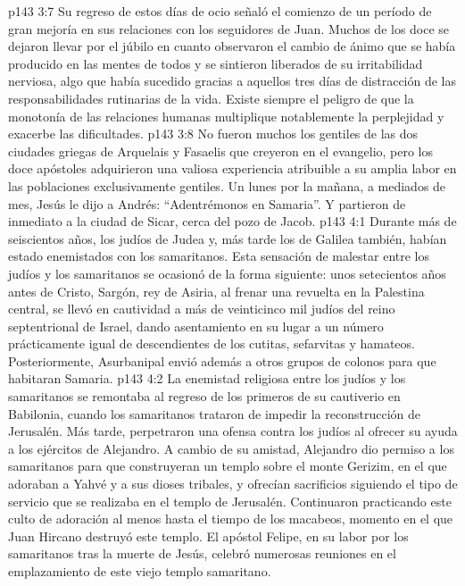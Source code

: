 \vs p143 3:7 Su regreso de estos días de ocio señaló el comienzo de un período de gran mejoría en sus relaciones con los seguidores de Juan. Muchos de los doce se dejaron llevar por el júbilo en cuanto observaron el cambio de ánimo que se había producido en las mentes de todos y se sintieron liberados de su irritabilidad nerviosa, algo que había sucedido gracias a aquellos tres días de distracción de las responsabilidades rutinarias de la vida. Existe siempre el peligro de que la monotonía de las relaciones humanas multiplique notablemente la perplejidad y exacerbe las dificultades.
\vs p143 3:8 \pc No fueron muchos los gentiles de las dos ciudades griegas de Arquelais y Fasaelis que creyeron en el evangelio, pero los doce apóstoles adquirieron una valiosa experiencia atribuible a su amplia labor en las poblaciones exclusivamente gentiles. Un lunes por la mañana, a mediados de mes, Jesús le dijo a Andrés: “Adentrémonos en Samaria”. Y partieron de inmediato a la ciudad de Sicar, cerca del pozo de Jacob.
\vs p143 4:1 Durante más de seiscientos años, los judíos de Judea y, más tarde los de Galilea también, habían estado enemistados con los samaritanos. Esta sensación de malestar entre los judíos y los samaritanos se ocasionó de la forma siguiente: unos setecientos años antes de Cristo, Sargón, rey de Asiria, al frenar una revuelta en la Palestina central, se llevó en cautividad a más de veinticinco mil judíos del reino septentrional de Israel, dando asentamiento en su lugar a un número prácticamente igual de descendientes de los cutitas, sefarvitas y hamateos. Posteriormente, Asurbanipal envió además a otros grupos de colonos para que habitaran Samaria.
\vs p143 4:2 La enemistad religiosa entre los judíos y los samaritanos se remontaba al regreso de los primeros de su cautiverio en Babilonia, cuando los samaritanos trataron de impedir la reconstrucción de Jerusalén. Más tarde, perpetraron una ofensa contra los judíos al ofrecer su ayuda a los ejércitos de Alejandro. A cambio de su amistad, Alejandro dio permiso a los samaritanos para que construyeran un templo sobre el monte Gerizim, en el que adoraban a Yahvé y a sus dioses tribales, y ofrecían sacrificios siguiendo el tipo de servicio que se realizaba en el templo de Jerusalén. Continuaron practicando este culto de adoración al menos hasta el tiempo de los macabeos, momento en el que Juan Hircano destruyó este templo. El apóstol Felipe, en su labor por los samaritanos tras la muerte de Jesús, celebró numerosas reuniones en el emplazamiento de este viejo templo samaritano.
